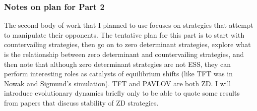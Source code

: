 \subsubsection{Notes on plan for Part 2}
The second body of work that I planned to use focuses on strategies that attempt to manipulate their opponents. The tentative plan for this part is to start with countervailing strategies, then go on to zero determinant strategies, explore what is the relationship between zero determinant and countervailing strategies, and then note that although zero determinant strategies are not ESS, they can perform interesting roles as catalysts of equilibrium shifts (like TFT was in Nowak and Sigmund's simulation). TFT and PAVLOV are both ZD. I will introduce evolutionary dynamics briefly only to be able to quote some results from papers that discuss stability of ZD strategies.







